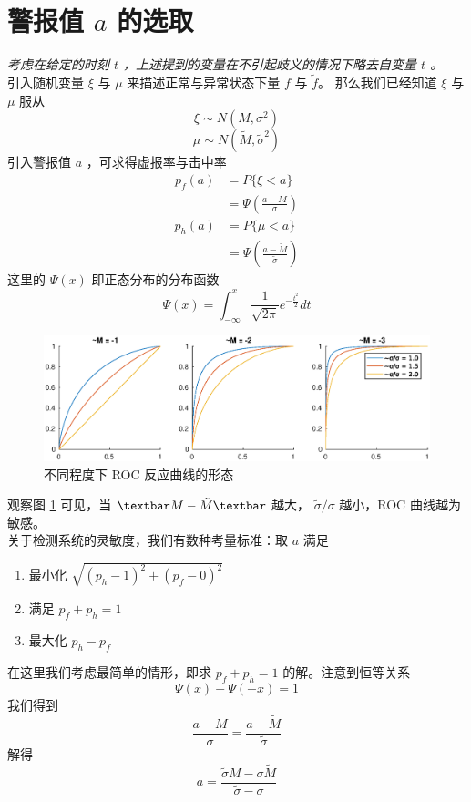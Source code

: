 \documentclass[a4paper]{article}
\begin{document}
\section{警报值 $a$ 的选取}
\emph{考虑在给定的时刻 $t$ ，上述提到的变量在不引起歧义的情况下略去自变量 $t$ 。}
\\
引入随机变量 $\xi$ 与 $\mu$ 来描述正常与异常状态下量 $f$ 与 $\tilde{f}$。
那么我们已经知道 $\xi$ 与 $\mu$ 服从
\begin{equation}
	\label{eqn:det_xi}
	\xi \sim N(M, \sigma^2)
\end{equation}
\begin{equation}
	\label{eqn:det_mu}
	\mu \sim N(\tilde{M}, \tilde{\sigma}^2)
\end{equation}
引入警报值 $a$ ，可求得虚报率与击中率
\begin{align}
	p_f(a) &= P\{\xi < a\} \\
		&= \Psi(\frac{a-M}{\sigma}) \label{eqn:det-p_f}
\end{align}
\begin{align}
	p_h(a) &= P\{\mu < a\} \\
		&= \Psi(\frac{a-\tilde{M}}{\tilde{\sigma}}) \label{eqn:det-p_h}
\end{align}
这里的 $\Psi(x)$ 即正态分布的分布函数
\begin{equation}
	\label{eqn:psi}
	\Psi(x) = \int_{-\infty}^{x} \frac{1}{\sqrt{2\pi}}e^{-\frac{t^2}{2}} dt
\end{equation}
\begin{figure}[htbp]
	\centering
	\includegraphics[scale=0.6]{pic/tilde-M-tilde-sigma.eps}
	\caption{不同程度下 ROC 反应曲线的形态}
    \label{fig:roc}
\end{figure}
观察图 \ref{fig:roc} 可见，当 $\textbar M - \tilde{M} \textbar $ 越大， $ \tilde{\sigma} / \sigma $ 越小，ROC 曲线越为敏感。
\\
关于检测系统的灵敏度，我们有数种考量标准：取 $a$ 满足
\begin{enumerate}
	\item 最小化 $\sqrt{(p_h - 1)^2 + (p_f - 0)^2}$
	\item 满足 $p_f + p_h = 1$
	\item 最大化 $p_h - p_f$
\end{enumerate}
在这里我们考虑最简单的情形，即求 $p_f + p_h = 1$ 的解。注意到恒等关系 $$\Psi(x) + \Psi(-x) = 1$$ 我们得到
\begin{equation}
	\label{eqn:det_a_formula}
	\frac{a-M}{\sigma} = \frac{a-\tilde{M}}{\tilde{\sigma}}
\end{equation}
解得
\begin{equation}
	\label{eqn:det_a}
	a = \frac{\tilde{\sigma}M - \sigma \tilde{M}}{\tilde{\sigma} - \sigma}
\end{equation}
\end{document}
